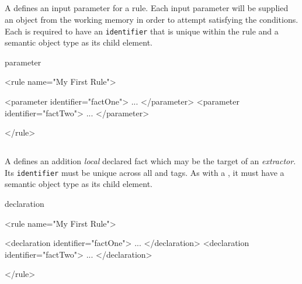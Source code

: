 
\subsection{}

A  defines an input parameter for a rule.  Each input
parameter will be supplied an object from the working memory in order
to attempt satisfying the conditions.  Each  is
required to have an \texttt{identifier} that is unique within the rule and a
semantic object type as its child element.

\begin{tagDesc}{parameter}
\attrs
\tags
\end{tagDesc}

\begin{center}
\begin{minipage}{0.8\textwidth}
\begin{tagExample}
<rule name="My First Rule">

    {\color{black}<parameter identifier="factOne">}
        ...
    {\color{black}</parameter>}
    {\color{black}<parameter identifier="factTwo">}
        ...
    {\color{black}</parameter>}

</rule>
\end{tagExample}
\end{minipage}
\end{center}


\subsection{}

A  defines an addition \emph{local} declared fact
which may be the target of an \emph{extractor}. Its
\texttt{identifier} must be unique across all  and
 tags.  As with a , it must have
a semantic object type as its child element.

\begin{tagDesc}{declaration}
\attrs
\tags
\end{tagDesc}

\begin{center}
\begin{minipage}{0.8\textwidth}
\begin{tagExample}
<rule name="My First Rule">

    {\color{black}<declaration identifier="factOne">}
        ...
    {\color{black}</declaration>}
    {\color{black}<declaration identifier="factTwo">}
        ...
    {\color{black}</declaration>}

</rule>
\end{tagExample}
\end{minipage}
\end{center}


